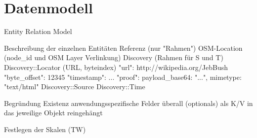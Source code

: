 \section{Datenmodell}
\label{datenmodell}

Entity Relation Model

  Beschreibung der einzelnen Entitäten
    Referenz (nur "Rahmen")
    OSM-Location (node\_id und OSM Layer Verlinkung)
    Discovery (Rahmen für S und T)
    Discovery::Locator (URL, byteindex)
        "url": http://wikipedia.org/JebBush
        "byte\_offset": 12345 %
        "timestamp": ...
        "proof": { payload\_base64: "...", mimetype: "text/html" }
    Discovery::Source
    Discovery::Time

    Begründung Existenz anwendungsspezifische Felder überall (optionals) als K/V in das jeweilige Objekt reingehängt

  Festlegen der Skalen (TW)